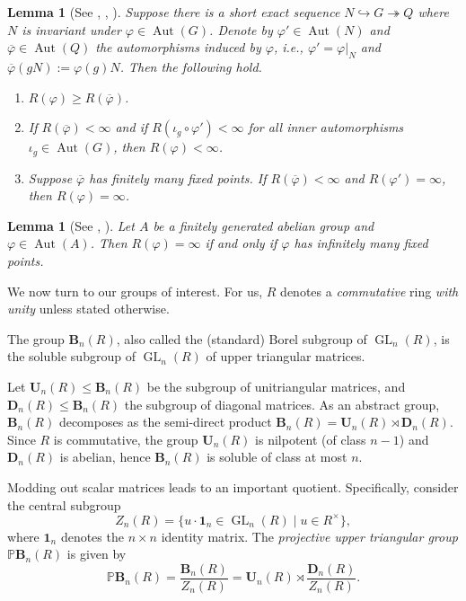 \documentclass[a4paper,11pt]{amsart}
\numberwithin{equation}{section}
\theoremstyle{plain}
\newtheorem{lem}[thm]{Lemma}
\theoremstyle{definition}
\DeclareMathOperator{\GL}{GL} %
\newcommand{\mbU}{\mathbf{U}} %
\newcommand{\mbD}{\mathbf{D}} %
\newcommand{\Mult}{\mathbb{G}_{m}} %
\newcommand{\mbB}{\mathbf{B}} %
\newcommand{\PB}{\mathbb{P}\mathbf{B}} %
\newcommand{\phee}{\varphi} %
\newcommand{\barra}[1]{\overline{#1}}
\newcommand{\set}[1]{\{ #1 \}}
\newcommand{\mb}{\mathbf}
\newcommand{\into}{\hookrightarrow}
\newcommand{\onto}{\twoheadrightarrow}
\DeclareMathOperator{\Aut}{Aut}
\begin{document}
\begin{lem}[{See \cite[Prop.~1.2]{Daciberg}, \cite[Thm.~1]{WongCrelle}, \cite[Lem.~1.1(2)]{DacibergWongCrelle}}] \label{lem:desempre}
Suppose there is a short exact sequence $N \into G \onto Q$ where $N$ is invariant under $\phee\in\Aut(G)$. Denote by $\phee' \in \Aut(N)$ and $\overline{\phee} \in \Aut(Q)$ the automorphisms induced by $\phee$, i.e., $\phee' = \phee|_N$ and $\barra{\phee}(gN) := \phee(g)N$. Then the following hold.
\begin{enumerate}
\item \label{PHEEvsPHEEbarra} $R(\phee) \geq R(\overline{\phee})$.
\item \label{PHEEbarra_and_innerPHEE'} 
If $R(\overline{\phee}) < \infty$ and if $R(\iota_g \circ \phee') < \infty$ for all inner automorphisms $\iota_g \in \Aut(G)$, 
then $R(\phee) < \infty$. 
\item \label{PHEEbarrafinite_and_PHEE'infinite} Suppose $\overline{\phee}$ has \emph{finitely many} fixed points. If $R(\overline{\phee}) < \infty$ and $R(\phee') = \infty$, then $R(\phee) = \infty$.
\end{enumerate}
\end{lem}

\begin{lem}[{See \cite[Section~2 and Lemma~4.1]{Romankov}, \cite{KarelDacibergAbelian}}] \label{lem:ReidemeisterAbelian}
Let $A$ be a \emph{finitely generated} abelian group and $\phee \in \Aut(A)$. 
Then $R(\phee) = \infty$ if and only if $\phee$ has \emph{infinitely many} fixed points.
\end{lem}

We now turn to 
our groups of interest. 
For us, $R$ denotes a \emph{commutative} ring \emph{with unity} unless stated otherwise. 

The group $\mbB_n(R)$, also called the (standard) Borel subgroup of $\GL_n(R)$, is the soluble subgroup of $\GL_n(R)$ of upper triangular matrices. 

Let $\mbU_n(R) \leq \mbB_n(R)$ be the subgroup of unitriangular matrices, and $\mbD_n(R) \leq \mbB_n(R)$ 
the subgroup of diagonal matrices. As an abstract group, $\mbB_n(R)$ decomposes as the semi-direct product $\mbB_n(R) = \mbU_n(R) \rtimes \mbD_n(R)$. 
Since $R$ is commutative, the group $\mbU_n(R)$ is nilpotent (of class $n-1$) and {$\mbD_n(R)$} %
is abelian, hence $\mbB_n(R)$ is soluble of class at most $n$.

Modding out scalar matrices leads to an important quotient. Specifically, 
consider the central subgroup 
\[Z_n(R) = \set{u\cdot \mb{1}_n \in \GL_n(R) \mid u \in R^\times},\] 
where $\mb{1}_n$ denotes the $n \times n$ identity matrix.  
The \emph{projective upper triangular group} $\PB_n(R)$ 
is given by 
\[ \PB_n(R) = \frac{\mbB_n(R)}{Z_n(R)} = \mbU_n(R) \rtimes \frac{\mbD_n(R)}{Z_n(R)}.\] 
\end{document}
